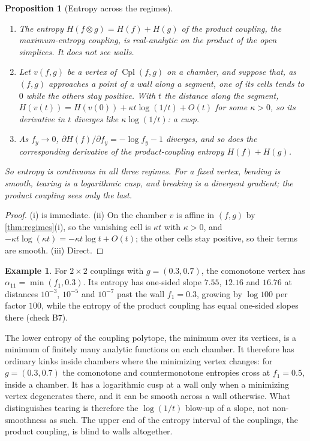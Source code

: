\documentclass[11pt]{article}
\newtheorem{proposition}[theorem]{Proposition}
\theoremstyle{definition}
\newtheorem{example}[theorem]{Example}
\theoremstyle{remark}
\newcommand{\Cpl}{\operatorname{Cpl}}
\begin{document}
\begin{proposition}[Entropy across the regimes]\label{prop:entropyregimes}
\begin{enumerate}[label=(\roman*)]
\item The entropy $H(f\otimes g)=H(f)+H(g)$ of the product coupling, the maximum-entropy coupling, is real-analytic on the
  product of the open simplices. It does not see walls.
\item Let $v(f,g)$ be a vertex of $\Cpl(f,g)$ on a chamber, and suppose that, as $(f,g)$ approaches a point of a wall along a
  segment, one of its cells tends to $0$ while the others stay positive. With $t$ the distance along the segment,
  $H(v(t))=H(v(0))+\kappa t\log(1/t)+O(t)$ for some $\kappa>0$, so its derivative in $t$ diverges like $\kappa\log(1/t)$: a cusp.
\item As $f_y\to0$, $\partial H(f)/\partial f_y=-\log f_y-1$ diverges, and so does the corresponding derivative of the
  product-coupling entropy $H(f)+H(g)$.
\end{enumerate}
So entropy is continuous in all three regimes. For a fixed vertex, bending is smooth, tearing is a logarithmic cusp, and
breaking is a divergent gradient; the product coupling sees only the last.
\end{proposition}
\begin{proof}
(i) is immediate. (ii) On the chamber $v$ is affine in $(f,g)$ by \cref{thm:regimes}(i), so the vanishing cell is $\kappa t$ with
$\kappa>0$, and $-\kappa t\log(\kappa t)=-\kappa t\log t+O(t)$; the other cells stay positive, so their terms are smooth. (iii)
Direct.
\end{proof}

\begin{example}
For $2\times2$ couplings with $g=(0.3,0.7)$, the comonotone vertex has $\alpha_{11}=\min(f_1,0.3)$. Its entropy has one-sided slope
$7.55$, $12.16$ and $16.76$ at distances $10^{-3}$, $10^{-5}$ and $10^{-7}$ past the wall $f_1=0.3$, growing by $\log100$ per factor
$100$, while the entropy of the product coupling has equal one-sided slopes there (check B7).
\end{example}

The lower entropy of the coupling polytope, the minimum over its vertices, is a minimum of finitely many analytic functions on
each chamber. It therefore has ordinary kinks inside chambers where the minimizing vertex changes: for $g=(0.3,0.7)$ the
comonotone and countermonotone entropies cross at $f_1=0.5$, inside a chamber. It has a logarithmic cusp at a wall only when a
minimizing vertex degenerates there, and it can be smooth across a wall otherwise. What distinguishes tearing is therefore the
$\log(1/t)$ blow-up of a slope, not non-smoothness as such. The upper end of the entropy interval of the couplings, the product
coupling, is blind to walls altogether.
\end{document}

